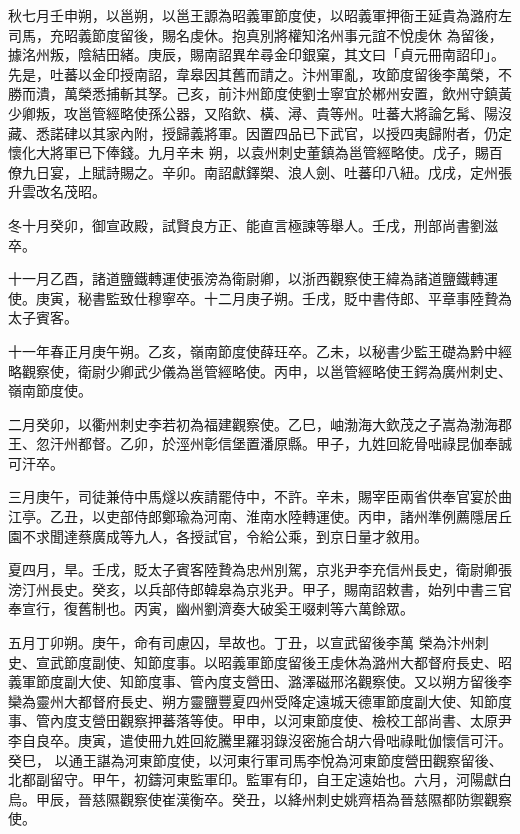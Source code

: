 \begin{pinyinscope}
 秋七月壬申朔，以邕朔，以邕王謜為昭義軍節度使，以昭義軍押衙王延貴為潞府左司馬，充昭義節度留後，賜名虔休。抱真別將權知洺州事元誼不悅虔休
 為留後，據洺州叛，陰結田緒。庚辰，賜南詔異牟尋金印銀窠，其文曰「貞元冊南詔印」。先是，吐蕃以金印授南詔，韋皋因其舊而請之。汴州軍亂，攻節度留後李萬榮，不勝而潰，萬榮悉捕斬其孥。己亥，前汴州節度使劉士寧宜於郴州安置，飲州守鎮黃少卿叛，攻邕管經略使孫公器，又陷欽、橫、潯、貴等州。吐蕃大將論乞髯、陽沒藏、悉諾硉以其家內附，授歸義將軍。因置四品已下武官，以授四夷歸附者，仍定懷化大將軍已下俸錢。九月辛未
 朔，以袁州刺史董鎮為邕管經略使。戊子，賜百僚九日宴，上賦詩賜之。辛卯。南詔獻鐸槊、浪人劍、吐蕃印八紐。戊戌，定州張升雲改名茂昭。



 冬十月癸卯，御宣政殿，試賢良方正、能直言極諫等舉人。壬戌，刑部尚書劉滋卒。



 十一月乙酉，諸道鹽鐵轉運使張滂為衛尉卿，以浙西觀察使王緯為諸道鹽鐵轉運使。庚寅，秘書監致仕穆寧卒。十二月庚子朔。壬戌，貶中書侍郎、平章事陸贄為太子賓客。



 十一年春正月庚午朔。乙亥，嶺南節度使薛玨卒。乙未，以秘書少監王礎為黔中經略觀察使，衛尉少卿武少儀為邕管經略使。丙申，以邕管經略使王鍔為廣州刺史、嶺南節度使。



 二月癸卯，以衢州刺史李若初為福建觀察使。乙巳，岫渤海大欽茂之子嵩為渤海郡王、忽汗州都督。乙卯，於涇州彰信堡置潘原縣。甲子，九姓回紇骨咄祿昆伽奉誠可汗卒。



 三月庚午，司徒兼侍中馬燧以疾請罷侍中，不許。辛未，賜宰臣兩省供奉官宴於曲
 江亭。乙丑，以吏部侍郎鄭瑜為河南、淮南水陸轉運使。丙申，諸州準例薦隱居丘園不求聞達蔡廣成等九人，各授試官，令給公乘，到京日量才敘用。



 夏四月，旱。壬戌，貶太子賓客陸贄為忠州別駕，京兆尹李充信州長史，衛尉卿張滂汀州長史。癸亥，以兵部侍郎韓皋為京兆尹。甲子，賜南詔敕書，始列中書三官奉宣行，復舊制也。丙寅，幽州劉濟奏大破奚王啜剌等六萬餘眾。



 五月丁卯朔。庚午，命有司慮囚，旱故也。丁丑，以宣武留後李萬
 榮為汴州刺史、宣武節度副使、知節度事。以昭義軍節度留後王虔休為潞州大都督府長史、昭義軍節度副大使、知節度事、管內度支營田、潞澤磁邢洺觀察使。又以朔方留後李欒為靈州大都督府長史、朔方靈鹽豐夏四州受降定遠城天德軍節度副大使、知節度事、管內度支營田觀察押蕃落等使。甲申，以河東節度使、檢校工部尚書、太原尹李自良卒。庚寅，遣使冊九姓回紇騰里羅羽錄沒密施合胡六骨咄祿毗伽懷信可汗。癸巳，
 以通王諶為河東節度使，以河東行軍司馬李悅為河東節度營田觀察留後、北都副留守。甲午，初鑄河東監軍印。監軍有印，自王定遠始也。六月，河陽獻白烏。甲辰，晉慈隰觀察使崔漢衡卒。癸丑，以絳州刺史姚齊梧為晉慈隰都防禦觀察使。




\end{pinyinscope}
